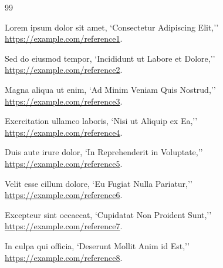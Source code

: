 \documentclass[12pt,a4paper,oneside]{report}
\begin{document}
\clearpage
{}
\begin{thebibliography}{99}
\setlength{\itemsep}{2pt}
\setlength{\parsep}{0pt}

 Lorem ipsum dolor sit amet, `Consectetur Adipiscing Elit,'' \url{https://example.com/reference1}.

 Sed do eiusmod tempor, `Incididunt ut Labore et Dolore,'' \url{https://example.com/reference2}.

 Magna aliqua ut enim, `Ad Minim Veniam Quis Nostrud,'' \url{https://example.com/reference3}.

 Exercitation ullamco laboris, `Nisi ut Aliquip ex Ea,'' \url{https://example.com/reference4}.

 Duis aute irure dolor, `In Reprehenderit in Voluptate,'' \url{https://example.com/reference5}.

 Velit esse cillum dolore, `Eu Fugiat Nulla Pariatur,'' \url{https://example.com/reference6}.

 Excepteur sint occaecat, `Cupidatat Non Proident Sunt,'' \url{https://example.com/reference7}.

 In culpa qui officia, `Deserunt Mollit Anim id Est,'' \url{https://example.com/reference8}.

\end{thebibliography}
\end{document}
